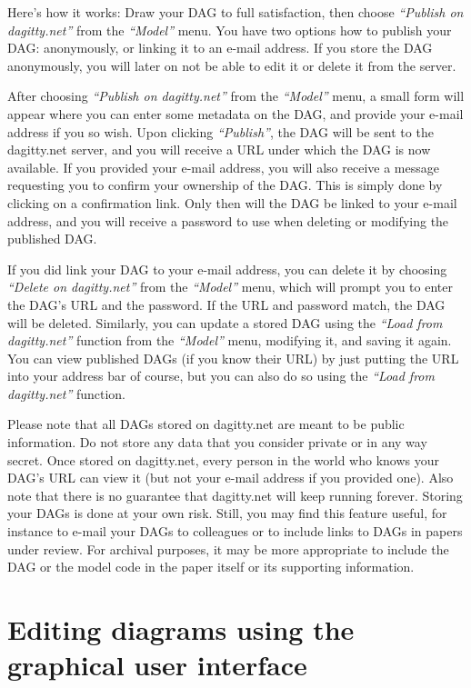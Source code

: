 \documentclass[a4paper]{article} %
\newcommand{\action}[1]{\emph{``#1''}}
\begin{document}
Here's how it works: Draw your DAG to full satisfaction, then choose 
\action{Publish on dagitty.net} from the \action{Model} menu. You have
two options how to publish your DAG: anonymously, or linking it to an e-mail
address. If you store the DAG anonymously, you will later on not be able
to edit it or delete it from the server.

After choosing \action{Publish on dagitty.net} from the \action{Model} menu,
a small form will appear where you can enter some metadata on the DAG,
and provide your e-mail address if you so wish. Upon clicking \action{Publish},
the DAG will be sent to the dagitty.net server, and you will receive a URL under
which the DAG is now available. If you provided your e-mail address, you
will also receive a message requesting you to confirm your ownership of the DAG.
This is simply done by clicking on a confirmation link. Only then will the DAG
be linked to your e-mail address, and you will receive a password to use when
deleting or modifying the published DAG.

If you did link your DAG to your e-mail address, you can delete it by choosing
\action{Delete on dagitty.net} from the \action{Model} menu, which will prompt you
to enter the DAG's URL and the password. If the URL and password match,
the DAG will be deleted.
Similarly, you can update a stored DAG using the \action{Load from dagitty.net} function
from the  \action{Model} menu, modifying it, and saving it again. 
You can view published DAGs (if you know their URL)
by just putting the URL into your address bar of course, but you can also do
so using the \action{Load from dagitty.net} function. 

Please note that all DAGs stored on dagitty.net are meant to be public information.
Do not store any data that you consider private or in any way secret.
Once stored on dagitty.net, every person in the world who knows your DAG's URL
can view it (but not your e-mail address if you provided one). Also note that there is
no guarantee that dagitty.net will keep running forever. Storing your DAGs is done at
your own risk. Still, you may find this feature useful, for instance to e-mail your DAGs
to colleagues or to include links to DAGs in papers under review. For archival
purposes, it may be more appropriate to include the DAG or the model code in
the paper itself or its supporting information.

\section{Editing diagrams using the graphical user interface} 
\end{document}
